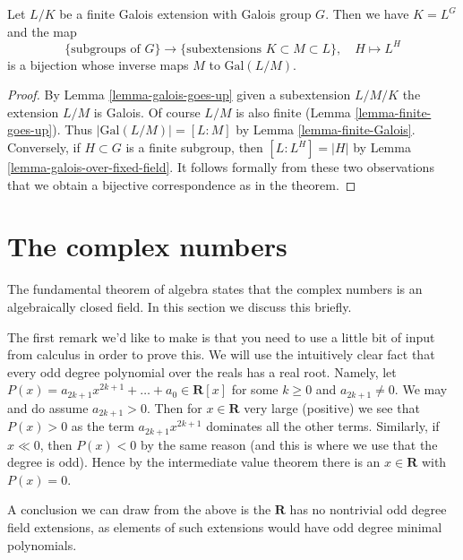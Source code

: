 \begin{theorem}
\label{theorem-galois-theory}
Let $L/K$ be a finite Galois extension with Galois group $G$.
Then we have $K = L^G$ and the map
$$
\{\text{subgroups of }G\}
\longrightarrow
\{\text{subextensions }K \subset M \subset L\},\quad
H \longmapsto L^H
$$
is a bijection whose inverse maps $M$ to $\text{Gal}(L/M)$.
\end{theorem}

\begin{proof}
By Lemma \ref{lemma-galois-goes-up} given a subextension $L/M/K$
the extension $L/M$ is Galois. Of course $L/M$ is also finite
(Lemma \ref{lemma-finite-goes-up}). Thus $|\text{Gal}(L/M)| = [L : M]$
by Lemma \ref{lemma-finite-Galois}.
Conversely, if $H \subset G$ is a finite subgroup, then
$[L : L^H] = |H|$ by Lemma \ref{lemma-galois-over-fixed-field}.
It follows formally from these two observations that we obtain
a bijective correspondence as in the theorem.
\end{proof}



\section{The complex numbers}
\label{section-complex-numbers}

\noindent
The fundamental theorem of algebra states that the complex numbers
is an algebraically closed field. In this section we discuss this
briefly.

\medskip\noindent
The first remark we'd like to make is that you need to use a little
bit of input from calculus in order to prove this. We will use the
intuitively clear fact that every odd degree polynomial over
the reals has a real root. Namely, let
$P(x) = a_{2k + 1} x^{2k + 1} + \ldots + a_0 \in \mathbf{R}[x]$
for some $k \geq 0$ and $a_{2k + 1} \not = 0$.
We may and do assume $a_{2k + 1} > 0$. Then for $x \in \mathbf{R}$
very large (positive) we see that $P(x) > 0$ as the term
$a_{2k + 1} x^{2k + 1}$ dominates all the other terms. Similarly,
if $x \ll 0$, then $P(x) < 0$ by the same reason (and this is where
we use that the degree is odd). Hence by the intermediate value
theorem there is an $x \in \mathbf{R}$ with $P(x) = 0$.

\medskip\noindent
A conclusion we can draw from the above is the $\mathbf{R}$ has
no nontrivial odd degree field extensions, as elements of such extensions
would have odd degree minimal polynomials.

